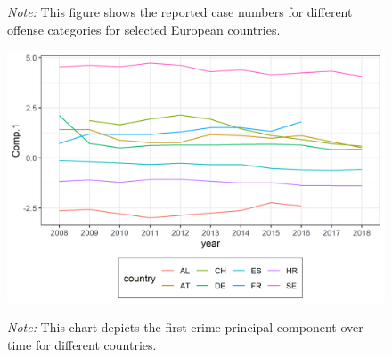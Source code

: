 \documentclass[a4paper,12pt]{article}
\begin{document}
\begin{figure}
\begin{flushleft}
\footnotesize{\textit{Note:} This figure shows the reported case numbers for different offense categories for selected European countries.
\label{fig:crime_case_data}	
}
\end{flushleft}
\end{figure}


\begin{figure}
\begin{minipage}{0.9\textwidth}
  \includegraphics[trim={0 0 0 0},width=\linewidth]{charts/princial_component_1.png}
\begin{flushleft}
\footnotesize{\textit{Note:} This chart depicts the first crime principal component over time for different countries. 
\label{fig:princial_component_1}	
}
\end{flushleft}
\end{minipage}
\end{figure}
\end{document}
